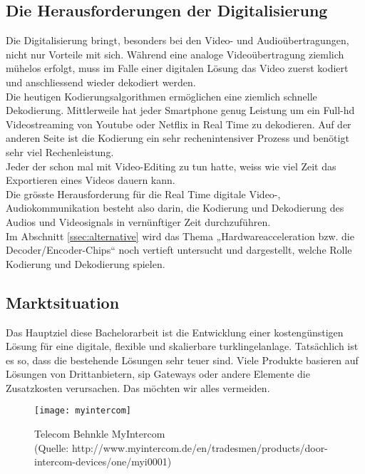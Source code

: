 \subsection{Die Herausforderungen der Digitalisierung}
Die Digitalisierung bringt, besonders bei den Video- und Audioübertragungen, nicht nur Vorteile mit sich.  Während eine analoge Videoübertragung ziemlich mühelos erfolgt, muss im Falle einer digitalen Lösung das Video zuerst kodiert und anschliessend wieder dekodiert werden.
\\
Die heutigen Kodierungsalgorithmen ermöglichen eine ziemlich schnelle Dekodierung. Mittlerweile hat jeder Smartphone genug Leistung um ein Full-\gls{hd} Videostreaming von Youtube oder Netflix in Real Time zu dekodieren. Auf der anderen Seite ist die Kodierung ein sehr rechenintensiver Prozess und benötigt sehr viel Rechenleistung.
\\
Jeder der schon mal mit Video-Editing zu tun hatte, weiss wie viel Zeit das Exportieren eines Videos dauern kann.
\\
Die grösste Herausforderung für die Real Time digitale Video-, Audiokommunikation besteht also darin, die Kodierung und Dekodierung des Audios und Videosignals in vernünftiger Zeit durchzuführen.
\\
Im Abschnitt \ref{ssec:alternative} wird das Thema „Hardwareacceleration bzw. die Decoder/Encoder-Chips“ noch vertieft untersucht und dargestellt, welche Rolle Kodierung und Dekodierung spielen. 

\subsection{Marktsituation}
\label{sec:marktsituation}
Das Hauptziel diese Bachelorarbeit ist die Entwicklung einer kostengünstigen Lösung für eine digitale, flexible und skalierbare \gls{turklingelanlage}. Tatsächlich ist es so, dass die bestehende Lösungen sehr teuer sind. Viele Produkte basieren auf Lösungen von Drittanbietern, \gls{sip} Gateways oder andere Elemente die Zusatzkosten verursachen. Das möchten wir alles vermeiden.

\begin{figure}[htb!]
	\begin{center}
		\texttt{[image: myintercom]}
		\caption[Telecom Behnkle MyIntercom]{Telecom Behnkle MyIntercom \\
		(Quelle: http://www.myintercom.de/en/tradesmen/products/door-intercom-devices/one/myi0001)}
		\label{fig:myintercom}
	\end{center}
\end{figure}

